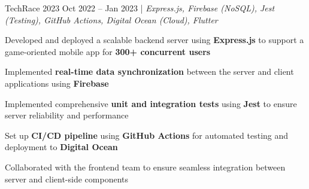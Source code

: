 \resumeSubheadings
{TechRace 2023 }
{Oct 2022 -- Jan 2023}
{}{}{| \textit{Express.js, Firebase (NoSQL), Jest (Testing), GitHub Actions, Digital Ocean (Cloud), Flutter}}
\resumeItemListStart
\item Developed and deployed a scalable backend server using \textbf{Express.js} to support a game-oriented mobile app for \textbf{300+ concurrent users}
\item Implemented \textbf{real-time data synchronization} between the server and client applications using \textbf{Firebase}
\item Implemented comprehensive \textbf{unit and integration tests} using \textbf{Jest} to ensure server reliability and performance
\item Set up \textbf{CI/CD pipeline} using \textbf{GitHub Actions} for automated testing and deployment to \textbf{Digital Ocean}
\item Collaborated with the frontend team to ensure seamless integration between server and client-side components
\resumeItemListEnd